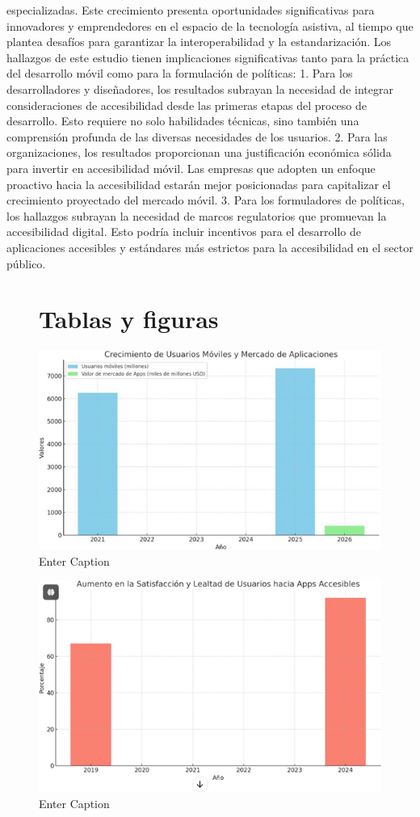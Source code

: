 \documentclass[12pt]{article}
\begin{document}
especializadas. Este crecimiento presenta oportunidades significativas para innovadores y emprendedores en el espacio de la tecnología asistiva, al tiempo que plantea desafíos para garantizar la interoperabilidad y la estandarización.
Los hallazgos de este estudio tienen implicaciones significativas tanto para la práctica del desarrollo móvil como para la formulación de políticas:
1.	Para los desarrolladores y diseñadores, los resultados subrayan la necesidad de integrar consideraciones de accesibilidad desde las primeras etapas del proceso de desarrollo. Esto requiere no solo habilidades técnicas, sino también una comprensión profunda de las diversas necesidades de los usuarios.
2.	Para las organizaciones, los resultados proporcionan una justificación económica sólida para invertir en accesibilidad móvil. Las empresas que adopten un enfoque proactivo hacia la accesibilidad estarán mejor posicionadas para capitalizar el crecimiento proyectado del mercado móvil.
3.	Para los formuladores de políticas, los hallazgos subrayan la necesidad de marcos regulatorios que promuevan la accesibilidad digital. Esto podría incluir incentivos para el desarrollo de aplicaciones accesibles y estándares más estrictos para la accesibilidad en el sector público.
\begin{figure}
\section*{Tablas y figuras}
\end{figure}
\begin{figure}
    \centering
    \includegraphics[width=0.8\linewidth]{primera.png}
    \caption{Enter Caption}
    \label{fig:enter-label}
\end{figure}
\begin{figure}
    \centering
    \includegraphics[width=0.8\linewidth]{segunda.png}
    \caption{Enter Caption}
    \label{fig:enter-label}
\end{figure}
\end{document}
